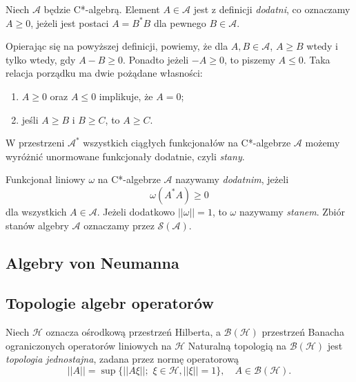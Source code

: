 \begin{Definition}
 Niech $\mathcal{A}$ będzie C*-algebrą. Element $A \in \mathcal{A}$ jest z
definicji \emph{dodatni}, co oznaczamy $A \geq 0$, jeżeli jest postaci
$A = B^{*}B$ dla pewnego $B \in \mathcal{A}$.
\end{Definition}

Opierając się na powyższej definicji, powiemy, że dla $A, B \in \mathcal{A}$,
$A \geq B$ wtedy i tylko wtedy, gdy $A-B \geq 0$. Ponadto jeżeli $-A
\geq 0$, to piszemy $A \leq 0$.
Taka relacja porządku ma dwie
pożądane własności:
\begin{enumerate}
 \item $A \geq 0$ oraz $A \leq 0$ implikuje, że $A =0$;
 \item jeśli $A \geq B$ i $B \geq C$, to $A \geq C$.
\end{enumerate}

W przestrzeni $\mathcal{A}^{*}$ wszystkich ciągłych funkcjonałów na
C*-algebrze $\mathcal{A}$ możemy wyróżnić unormowane funkcjonały dodatnie,
czyli \emph{stany}.

\begin{Definition}
 \label{def:stateOnCalg}
  Funkcjonał liniowy $\omega$ na C*-algebrze $\mathcal{A}$ nazywamy
\emph{dodatnim}, jeżeli
\begin{equation}
 \label{eq:stateOnCalg}
  \omega(A^{*}A) \geq 0
\end{equation}
dla wszystkich $A \in \mathcal{A}$.
Jeżeli dodatkowo $||\omega|| = 1$, to $\omega$ nazywamy \emph{stanem}.
Zbiór stanów algebry $\mathcal{A}$ oznaczamy przez $\mathcal{S}(\mathcal{A})$.
\end{Definition}

\subsection{Algebry von Neumanna}


\subsection{Topologie algebr operatorów}
Niech $\mathcal{H}$ oznacza ośrodkową przestrzeń Hilberta, a $\mathcal{B}(\mathcal{H})$ przestrzeń
Banacha ograniczonych operatorów liniowych na $\mathcal{H}$
Naturalną topologią na $\mathcal{B}(\mathcal{H})$ jest \emph{topologia jednostajna}, zadana
przez normę operatorową
\begin{equation}
 \label{eq:operatorNorm}
  ||A|| = %
  \sup \{ ||A\xi||; \, \, \xi \in \mathcal{H}, %
	    ||\xi|| = 1 \}, \quad A \in \mathcal{B}(\mathcal{H}).
\end{equation}

